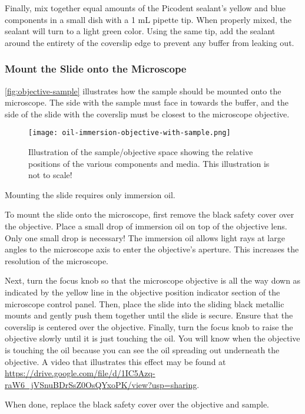 \documentclass[10pt,a4paper,oneside]{book}
\begin{document}
Finally, mix together equal amounts of the Picodent sealant's yellow and blue components in a small dish with a 1 mL pipette tip. When properly mixed, the sealant will turn to a light green color. Using the same tip, add the sealant around the entirety of the coverslip edge to prevent any buffer from leaking out.

\subsubsection{Mount the Slide onto the Microscope}

\autoref{fig:objective-sample} illustrates how the sample should be mounted onto the microscope. The side with the sample must face in towards the buffer, and the side of the slide with the coverslip must be closest to the microscope objective.

\begin{figure}[ht]
    \centering
    \texttt{[image: oil-immersion-objective-with-sample.png]}
    \caption{Illustration of the sample/objective space showing the relative positions of the various components and media. This illustration is not to scale!}
    \label{fig:objective-sample}
\end{figure}

Mounting the slide requires only immersion oil.

To mount the slide onto the microscope, first remove the black safety cover over the objective. Place a small drop of immersion oil on top of the objective lens. Only one small drop is necessary! The immersion oil allows light rays at large angles to the microscope axis to enter the objective's aperture. This increases the resolution of the microscope.

Next, turn the focus knob so that the microscope objective is all the way down as indicated by the yellow line in the objective position indicator section of the microscope control panel. Then, place the slide into the sliding black metallic mounts and gently push them together until the slide is secure. Ensure that the coverslip is centered over the objective. Finally, turn the focus knob to raise the objective slowly until it is just touching the oil. You will know when the objective is touching the oil because you can see the oil spreading out underneath the objective. A video that illustrates this effect may be found at \url{https://drive.google.com/file/d/1IC5Azq-raW6_jVSnuBDrSsZ0OsQYxoPK/view?usp=sharing}.

When done, replace the black safety cover over the objective and sample.
\end{document}
